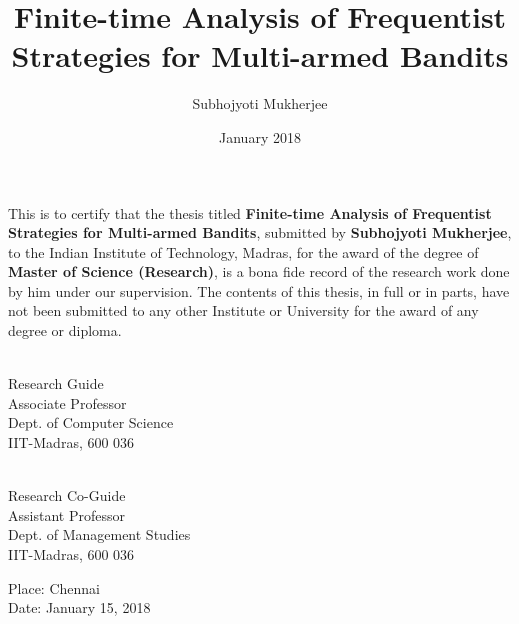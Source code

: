 \documentclass[MS,twoside]{iitmdiss}
\newcommand{\clearemptydoublepage}{\newpage{\cleardoublepage}}
\begin{document}

\title{Finite-time Analysis of Frequentist Strategies for Multi-armed Bandits}

\author{Subhojyoti Mukherjee}

\date{January 2018}

\maketitle



\clearemptydoublepage
\certificate

\vspace*{0.5in}

\noindent This is to certify that the thesis titled {\bf Finite-time Analysis of Frequentist Strategies for Multi-armed Bandits}, submitted by {\bf Subhojyoti Mukherjee}, 
  to the Indian Institute of Technology, Madras, for
the award of the degree of {\bf Master of Science (Research)}, is a bona fide
record of the research work done by him under our supervision.  The
contents of this thesis, in full or in parts, have not been submitted
to any other Institute or University for the award of any degree or
diploma.

\vspace*{1.5in}

\begin{singlespacing}
\hspace*{-0.25in}
\parbox{2.5in}{
 \\
\noindent Research Guide \\ 
\noindent Associate Professor \\
\noindent Dept. of Computer Science\\
\noindent IIT-Madras, 600 036 \\
} 
\hspace*{1.0in} 
\parbox{2.5in}{
 \\
\noindent Research Co-Guide \\ 
\noindent Assistant Professor \\
\noindent Dept.  of  Management Studies\\
\noindent IIT-Madras, 600 036 \\
}  
\end{singlespacing}
\vspace*{0.25in}
\noindent Place: Chennai\\
Date: January 15, 2018
\end{document}
